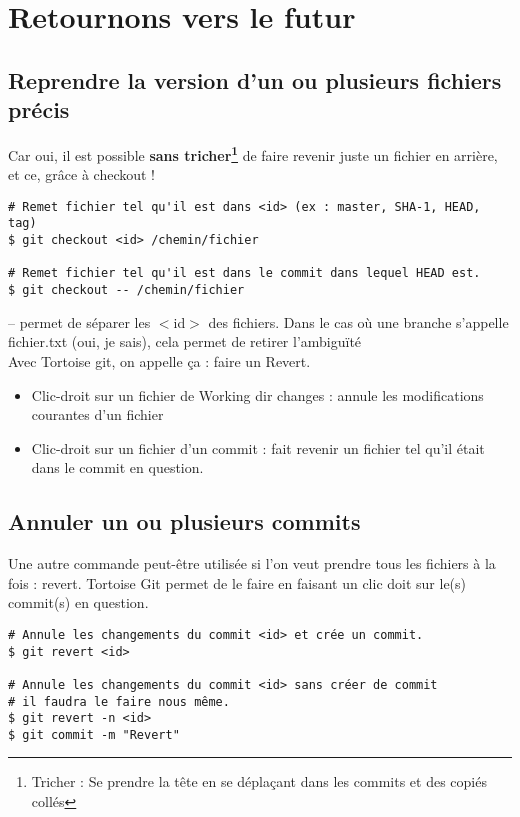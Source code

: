 \newpage
\section{Retournons vers le futur}
\subsection{Reprendre la version d'un ou plusieurs fichiers précis}

Car oui, il est possible \textbf{sans tricher\footnote{Tricher : Se prendre la tête en se déplaçant dans les commits et des copiés collés}} de faire revenir juste un fichier en arrière, et ce, grâce à checkout !

\begin{verbatim}
# Remet fichier tel qu'il est dans <id> (ex : master, SHA-1, HEAD, tag)
$ git checkout <id> /chemin/fichier

# Remet fichier tel qu'il est dans le commit dans lequel HEAD est.
$ git checkout -- /chemin/fichier
\end{verbatim}

-- permet de séparer les $<$id$>$ des fichiers. Dans le cas où une branche s'appelle fichier.txt (oui, je sais), cela permet de retirer l'ambiguïté\\

Avec Tortoise git, on appelle ça : faire un Revert.

\begin{itemize}
\item Clic-droit sur un fichier de Working dir changes : annule les modifications courantes d'un fichier
\item Clic-droit sur un fichier d'un commit : fait revenir un fichier tel qu'il était dans le commit en question.
\end{itemize}

\subsection{Annuler un ou plusieurs commits}
Une autre commande peut-être utilisée si l'on veut prendre tous les fichiers à la fois : revert. Tortoise Git permet de le faire en faisant un clic doit sur le(s) commit(s) en question.

\begin{verbatim}
# Annule les changements du commit <id> et crée un commit.
$ git revert <id>

# Annule les changements du commit <id> sans créer de commit
# il faudra le faire nous même.
$ git revert -n <id>
$ git commit -m "Revert"
\end{verbatim}

